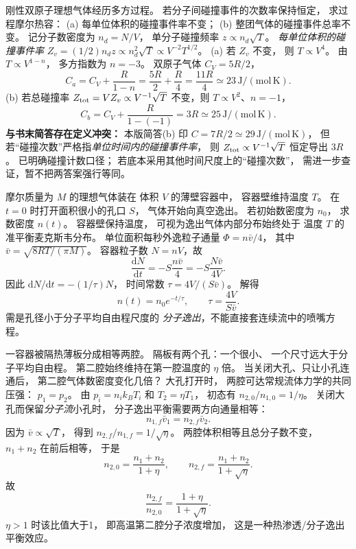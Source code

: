 刚性双原子理想气体经历多方过程。
若分子间碰撞事件的次数率保持恒定，
求过程摩尔热容：
(a) 每单位体积的碰撞事件率不变；
(b) 整团气体的碰撞事件总率不变。
\exsolution
记分子数密度为 $n_d=N/V$，
单分子碰撞频率
$z\propto n_d\sqrt T$。
\emph{每单位体积的碰撞事件率}
$Z_v=(1/2)n_dz
\propto n_d^2\sqrt T
\propto V^{-2}T^{1/2}$。
(a) 若 $Z_v$ 不变，
则 $T\propto V^4$。
由 $T\propto V^{1-n}$，
多方指数为 $n=-3$。
双原子气体 $C_V=5R/2$，
\[
\boxed{C_a=C_V+\frac R{1-n}
=\frac{5R}{2}+\frac R4
=\frac{11R}{4}\simeq23\,\mathrm{J/(mol\,K)}}.
\]
(b) 若总碰撞率
$Z_{\rm tot}=VZ_v\propto V^{-1}\sqrt T$
不变，则
$T\propto V^2$、$n=-1$，
\[
\boxed{C_b=C_V+\frac R{1-(-1)}
=3R\simeq25\,\mathrm{J/(mol\,K)}}.
\]
\excheck \textbf{与书末简答存在定义冲突：}
本版简答(b) 印 $C=7R/2\simeq29\,\mathrm{J/(mol\,K)}$，
但若“碰撞次数”严格指\emph{单位时间内的碰撞事件率}，
则 $Z_{\rm tot}\propto V^{-1}\sqrt T$ 恒定导出 $3R$。
已明确碰撞计数口径；
若底本采用其他时间尺度上的“碰撞次数”，
需进一步查证，暂不把两答案强行等同。

摩尔质量为 $M$ 的理想气体装在
体积 $V$ 的薄壁容器中，
容器壁维持温度 $T$。
在 $t=0$ 时打开面积很小的孔口 $S$，
气体开始向真空逸出。
若初始数密度为 $n_0$，
求数密度 $n(t)$。
\exsolution
容器壁保持温度，
可视为逸出气体内部分布始终处于
温度 $T$ 的准平衡麦克斯韦分布。
单位面积每秒外逸粒子通量
$\Phi=n\bar v/4$，
其中
$\bar v=\sqrt{8RT/(\pi M)}$。
容器粒子数 $N=nV$，故
\[
\frac{\mathrm dN}{\mathrm dt}
=-S\frac{n\bar v}{4}
=-S\frac{N\bar v}{4V}.
\]
因此
$\mathrm dN/\mathrm dt=-(1/\tau)N$，
时间常数
$\tau=4V/(S\bar v)$。
解得
\[
\boxed{n(t)=n_0e^{-t/\tau}},\qquad
\boxed{\tau=\frac{4V}{S\bar v}}.
\]
\excheck 需是孔径小于分子平均自由程尺度的
\emph{分子逸出}，不能直接套连续流中的喷嘴方程。

一容器被隔热薄板分成相等两腔。
隔板有两个孔：一个很小、
一个尺寸远大于分子平均自由程。
第二腔始终维持在第一腔温度的
$\eta$ 倍。
当关闭大孔、只让小孔连通后，
第二腔气体数密度变化几倍？
\exsolution
大孔打开时，
两腔可达常规流体力学的共同压强：
$p_1=p_2$。
由 $p_i=n_i k_BT_i$ 和
$T_2=\eta T_1$，
初态有
$n_{2,0}/n_{1,0}=1/\eta$。
关闭大孔而保留\emph{分子流}小孔时，
分子逸出平衡需要两方向通量相等：
\[
n_{1,f}\bar v_1=n_{2,f}\bar v_2.
\]
因为 $\bar v\propto\sqrt T$，
得到
$n_{2,f}/n_{1,f}=1/\sqrt\eta$。
两腔体积相等且总分子数不变，
$n_1+n_2$ 在前后相等，
于是
\[
n_{2,0}=\frac{n_1+n_2}{1+\eta},
\qquad
n_{2,f}=\frac{n_1+n_2}{1+\sqrt\eta}.
\]
故
\[
\boxed{\frac{n_{2,f}}{n_{2,0}}
=\frac{1+\eta}{1+\sqrt\eta}}.
\]
\excheck $\eta>1$ 时该比值大于1，
即高温第二腔分子浓度增加，
这是一种热渗透/分子逸出平衡效应。

